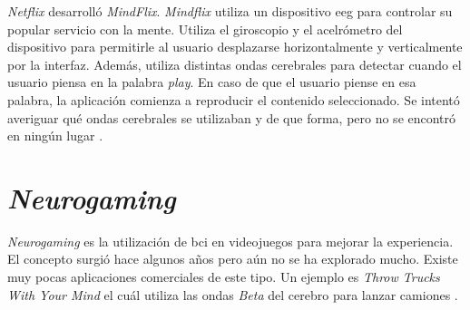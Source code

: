 \emph{Netflix} desarrolló \emph{MindFlix}. \emph{Mindflix} utiliza un dispositivo \acrshort{eeg} para controlar su popular servicio con la mente. Utiliza el giroscopio y el acelrómetro del dispositivo para permitirle al usuario desplazarse horizontalmente y verticalmente por la interfaz. Además, utiliza distintas ondas cerebrales para detectar cuando el usuario piensa en la palabra \emph{play}. En caso de que el usuario piense en esa palabra,  la aplicación comienza a reproducir el contenido seleccionado. Se intentó averiguar qué ondas cerebrales se utilizaban y de que forma, pero no se encontró en ningún lugar \cite{mindflix}.


\section{\emph{Neurogaming}}

\emph{Neurogaming} es la utilización de \acrshort{bci} en videojuegos para mejorar la experiencia. El concepto surgió hace algunos años pero aún no se ha explorado mucho. Existe muy pocas aplicaciones comerciales de este tipo. Un ejemplo es \emph{Throw Trucks With Your Mind} el cuál utiliza las ondas \emph{Beta} del cerebro para lanzar camiones \cite{neurogaming}.



